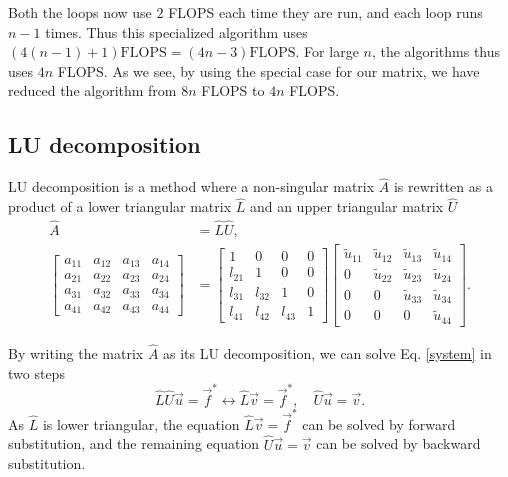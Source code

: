 \documentclass[%
 reprint,
nofootinbib,
 amsmath,amssymb,
 aps,
]{revtex4-1}
\begin{document}
Both the loops now use $2$ FLOPS each time they are run, and each loop runs $n-1$ times. Thus this specialized algorithm uses $(4(n-1) + 1) \mathrm{FLOPS} = (4n - 3) \mathrm{FLOPS}$. For large $n$, the algorithms thus uses $4n$ FLOPS.
As we see, by using the special case for our matrix, we have reduced the algorithm from $8n$ FLOPS to $4n$ FLOPS.

\subsection{LU decomposition}

LU decomposition is a method where a non-singular matrix $\hat{A}$ is rewritten as a product of a lower triangular matrix $\hat{L}$ and an upper triangular matrix $\hat{U}$
\begin{align*}
  \hat{A} &= \hat{L}\hat{U}, \\
  \begin{bmatrix}
      a_{11} & a_{12} & a_{13}  & a_{14}   \\
      a_{21} & a_{22} & a_{23} & a_{24}   \\
      a_{31} & a_{32} & a_{33} & a_{34} \\
      a_{41} & a_{42} & a_{43} & a_{44}
  \end{bmatrix}
  &=
    \begin{bmatrix}
      1 & 0 & 0   & 0   \\
      l_{21} & 1 & 0 & 0   \\
      l_{31} & l_{32} & 1 & 0 \\
      l_{41} & l_{42} & l_{43} & 1
  \end{bmatrix}
    \begin{bmatrix}
      \tilde{u}_{11} & \tilde{u}_{12} & \tilde{u}_{13}  & \tilde{u}_{14}   \\
      0 & \tilde{u}_{22} & \tilde{u}_{23} & \tilde{u}_{24}   \\
      0   & 0 & \tilde{u}_{33} & \tilde{u}_{34} \\
      0   & 0   & 0 & \tilde{u}_{44}
  \end{bmatrix}.
\end{align*}

By writing the matrix $\hat{A}$ as its LU decomposition, we can solve Eq. \eqref{system} in two steps
\begin{equation}
\hat{L}\hat{U}\vec{u} = \vec{f}^* \leftrightarrow \hat{L}\vec{v} = \vec{f}^*, \quad  \hat{U}\vec{u} = \vec{v}.
\end{equation}
As $\hat{L}$ is lower triangular, the equation $\hat{L}\vec{v} = \vec{f}^*$ can be solved by forward substitution, and the remaining equation $\hat{U}\vec{u} = \vec{v}$ can be solved by backward substitution.\\
\end{document}
